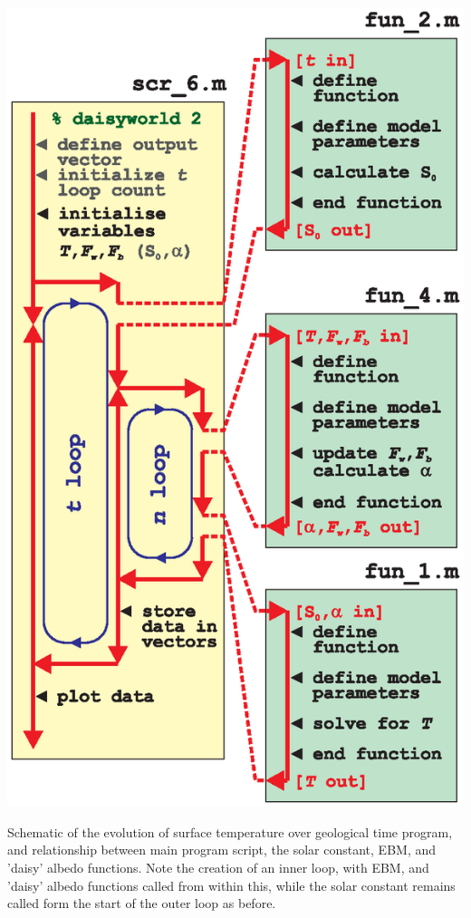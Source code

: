 \documentclass{tufte-book} %
\begin{document}
\begin{enumerate}
\begin{marginfigure}[-0.0in]
\includegraphics[width=\linewidth]{ch8-schematic-scr6fun1fun2fun4.eps}
\caption{Schematic of the evolution of surface temperature over geological time program, and relationship between main program script, the solar constant, EBM, and 'daisy' albedo functions. Note the creation of an inner loop, with EBM, and 'daisy' albedo functions called from within this, while the solar constant remains called form the start of the outer loop as before.}
\label{fig:ch8-schematic-scr6fun1fun2fun4}
\end{marginfigure}


\end{enumerate}
\end{document}
